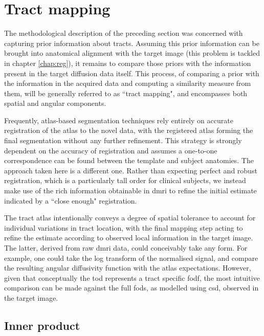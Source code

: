 \section{Tract mapping}
\label{sec:mapping}

The methodological description of the preceding section was concerned with capturing prior information about tracts.
Assuming this prior information can be brought into anatomical alignment with the target image (this problem is tackled in chapter \ref{chap:reg}), it remains to compare those priors with the information present in the target diffusion data itself.
This process, of comparing a prior with the information in the acquired data and computing a similarity measure from them, will be generally referred to as ``tract mapping", and encompasses both spatial and angular components.

Frequently, atlas-based segmentation techniques rely entirely on accurate registration of the atlas to the novel data, with the registered atlas forming the final segmentation without any further refinement.
This strategy is strongly dependent on the accuracy of registration and assumes a one-to-one correspondence can be found between the template and subject anatomies.
The approach taken here is a different one.
Rather than expecting perfect and robust registration, which is a particularly tall order for clinical subjects, we instead make use of the rich information obtainable in \gls{dmri} to refine the initial estimate indicated by a ``close enough" registration.

The tract atlas intentionally conveys a degree of spatial tolerance to account for individual variations in tract location, with the final mapping step acting to refine the estimate according to observed local information in the target image.
The latter, derived from raw \gls{dmri} data, could conceivably take any form.
For example, one could take the log transform of the normalised signal, and compare the resulting angular diffusivity function with the atlas expectations. %
However, given that conceptually the \gls{tod} represents a tract specific \gls{fodf}, the most intuitive comparison can be made against the full \glspl{fod}, as modelled using \gls{csd}, observed in the target image.

\subsection{Inner product}\label{sec:ip}

